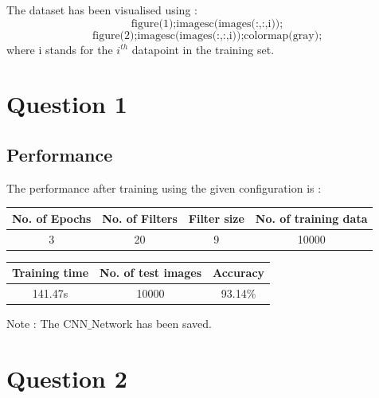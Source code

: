 \documentclass{article} %
\begin{document}
The dataset has been visualised using : \\
$$ \textrm{figure(1);imagesc(images(:,:,i));} $$
$$ \textrm{figure(2);imagesc(images(:,:,i));colormap(gray);} $$
where i stands for the $i^{th}$ datapoint in the training set.

\section{Question 1}
\subsection{Performance}
The performance after training using the given configuration is :
\begin{table}[H]
  \begin{center}
    \begin{tabular}{|c|c|c|c|} %
    \hline
      \textbf{No. of Epochs} & \textbf{No. of Filters} & \textbf{Filter size} & \textbf{No. of training data}\\
      \hline
      3 & 20 & 9 & 10000 \\
      \hline
    \end{tabular}
  \end{center}
\end{table}

\begin{table}[H]
  \begin{center}
    \begin{tabular}{|c|c|c|} %
    \hline
      \textbf{Training time} & \textbf{No. of test images} & \textbf{Accuracy}\\
      \hline
      141.47s & 10000 & 93.14$\%$ \\
      \hline
    \end{tabular}
  \end{center}
\end{table}

Note : The CNN$\_$Network has been saved.

\newpage
\section{Question 2}
\end{document}
